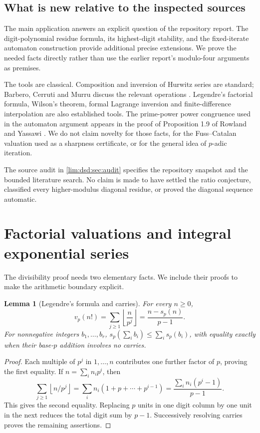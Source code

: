 \documentclass[11pt]{article}
\newtheorem{lemma}[theorem]{Lemma}
\theoremstyle{definition}
\theoremstyle{remark}
\begin{document}
\subsection{What is new relative to the inspected sources}

The main application answers an explicit question of the repository
report. The digit-polynomial residue formula, its highest-digit stability,
and the fixed-iterate automaton construction provide additional precise
extensions. We prove the needed facts directly rather than use the
earlier report's modulo-four arguments as premises.

The tools are classical. Composition and inversion of Hurwitz series
are standard; Barbero, Cerruti and Murru discuss the relevant operations
\cite{dsdBCM}. Legendre's factorial formula, Wilson's theorem, formal Lagrange
inversion and finite-difference interpolation are also established tools.
The prime-power power congruence used in the automaton argument appears
in the proof of Proposition 1.9 of Rowland and Yassawi \cite{dsdRY}. We do not claim novelty
for those facts, for the Fuss--Catalan valuation used as a sharpness
certificate, or for the general idea of $p$-adic iteration.

The source audit in \cref{lim:dsd:sec:audit} specifies the repository snapshot
and the bounded literature search. No claim is made to have settled the
ratio conjecture, classified every higher-modulus diagonal residue, or
proved the diagonal sequence automatic.

\section{Factorial valuations and integral exponential series}
\label{lim:dsd:sec:hurwitz}

The divisibility proof needs two elementary facts. We include their
proofs to make the arithmetic boundary explicit.

\begin{lemma}[Legendre's formula and carries]
\label{lim:dsd:lem:legendre}
For every $n\ge0$,
\begin{equation}
 v_p(n!)=\sum_{j\ge1}\left\lfloor\frac n{p^j}\right\rfloor
 =\frac{n-s_p(n)}{p-1}.
 \label{lim:dsd:eq:legendre}
\end{equation}
For nonnegative integers $b_1,\ldots,b_r$,
$s_p(\sum_i b_i)\le\sum_i s_p(b_i)$, with equality exactly when their
base-$p$ addition involves no carries.
\end{lemma}
\begin{proof}
Each multiple of $p^j$ in $1,\ldots,n$ contributes one further factor
of $p$, proving the first equality. If $n=\sum_i n_ip^i$, then
\[
 \sum_{j\ge1}\left\lfloor n/p^j\right\rfloor
 =\sum_i n_i(1+p+\cdots+p^{i-1})
 =\frac{\sum_i n_i(p^i-1)}{p-1}.
\]
This gives the second equality. Replacing $p$ units in one digit column
by one unit in the next reduces the total digit sum by $p-1$.
Successively resolving carries proves the remaining assertions.
\end{proof}
\end{document}
